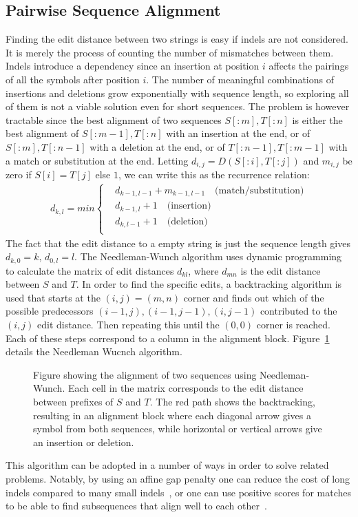 \subsection{Pairwise Sequence Alignment}
Finding the edit distance between two strings is easy if indels are not considered.
It is merely the process of counting the number of mismatches between them.
Indels introduce a dependency since an insertion at position $i$ affects the pairings of all the symbols after position $i$. The number of meaningful combinations of insertions and deletions grow exponentially with sequence length, so exploring all of them is not a viable solution even for short sequences.
The problem is however tractable since the best alignment of two sequences $S[:m], T[:n]$ is either the best alignment of $S[:m-1], T[:n]$ with an insertion at the end, or of $S[:m], T[:n-1]$ with a deletion at the end, or of $T[:n-1], T[:m-1]$ with a match or substitution at the end. 
Letting $d_{i,j} = D(S[:i], T[:j])$ and $m_{i,j}$ be zero if $S[i]=T[j]$ else $1$, we can write this as the recurrence relation:
\begin{align*}
  d_{k,l} = min\begin{cases}
  &d_{k-1,l-1}+m_{k-1, l-1}\quad \text{(match/substitution)}\\
  &d_{k-1,l}+1 \quad \text{(insertion)}\\
  &d_{k, l-1}+1 \quad \text{(deletion)}\\
\end{cases}
\end{align*}
The fact that the edit distance to a empty string is just the sequence length gives $d_{k, 0}=k,\,d_{0,l}=l$.
The Needleman-Wunch algorithm uses dynamic programming to calculate the matrix of edit distances $d_{kl}$, where $d_{mn}$ is the edit distance between $S$ and $T$. In order to find the specific edits, a backtracking algorithm is used that starts at the $(i, j) = (m, n)$ corner and finds out which of the possible predecessors $(i-1, j), (i-1, j-1), (i, j-1)$ contributed to the $(i, j)$ edit distance. Then repeating this until the $(0, 0)$ corner is reached. Each of these steps correspond to a column in the alignment block. Figure~\ref{fig:needle} details the Needleman Wucnch algorithm.
\begin{figure}
  \begin{tikzpicture}
    
  \end{tikzpicture}
  \label{fig:needle}
  \caption{Figure showing the alignment of two sequences using Needleman-Wunch. Each cell in the matrix corresponds to the edit distance between prefixes of $S$ and $T$. The red path shows the backtracking, resulting in an alignment block where each diagonal arrow gives a symbol from both sequences, while horizontal or vertical arrows give an insertion or deletion.}
\end{figure}
This algorithm can be adopted in a number of ways in order to solve related problems.
Notably, by using an affine gap penalty one can reduce the cost of long indels compared to many small indels~\cite{affine}, or one can use positive scores for matches to be able to find subsequences that align well to each other~\cite{smithwaterman}.

